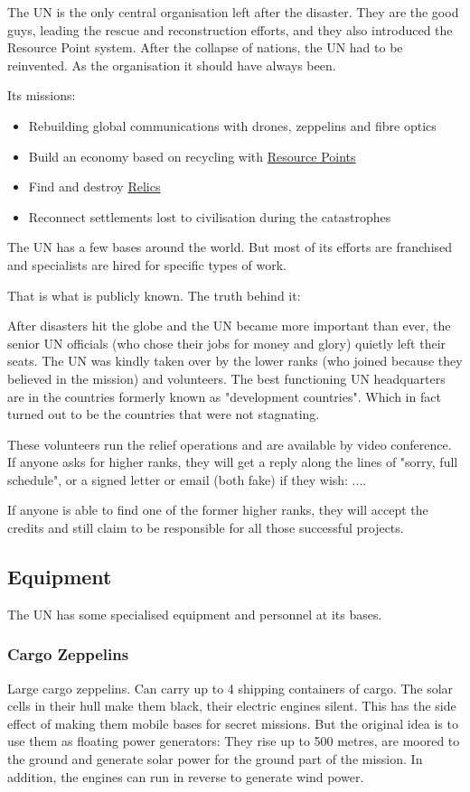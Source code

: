The UN is the only central organisation left after the disaster. They are the good guys, leading the rescue and reconstruction efforts, and they also introduced the Resource Point system. After the collapse of nations, the UN had to be reinvented. As the organisation it should have always been.

Its missions:

\begin{itemize}
    \item Rebuilding global communications with drones, zeppelins and fibre optics
    \item Build an economy based on recycling with \hyperref[sec:Resource Points]{Resource Points}
    \item Find and destroy \hyperref[sec:Relic]{Relics}
    \item Reconnect settlements lost to civilisation during the catastrophes
\end{itemize}

The UN has a few bases around the world. But most of its efforts are franchised and specialists are hired for specific types of work.

That is what is publicly known. The truth behind it:

After disasters hit the globe and the UN became more important than ever, the senior UN officials (who chose their jobs for money and glory) quietly left their seats. The UN was kindly taken over by the lower ranks (who joined because they believed in the mission) and volunteers. The best functioning UN headquarters are in the countries formerly known as "development countries". Which in fact turned out to be the countries that were not stagnating.

These volunteers run the relief operations and are available by video conference. If anyone asks for higher ranks, they will get a reply along the lines of "sorry, full schedule", or a signed letter or email (both fake) if they wish: ....

If anyone is able to find one of the former higher ranks, they will accept the credits and still claim to be responsible for all those successful projects.

\subsection{Equipment}

The UN has some specialised equipment and personnel at its bases.

\subsubsection{Cargo Zeppelins}
\label{sec:UN Cargo Zeppelins}
Large cargo zeppelins. Can carry up to 4 shipping containers of cargo. The solar cells in their hull make them black, their electric engines silent. This has the side effect of making them mobile bases for secret missions. But the original idea is to use them as floating power generators: They rise up to 500 metres, are moored to the ground and generate solar power for the ground part of the mission. In addition, the engines can run in reverse to generate wind power.

